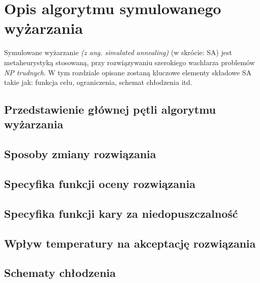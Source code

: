 \chapter{Opis algorytmu symulowanego wyżarzania} \label{chapter:sa-desc}
\label{annealing}
Symulowane wyżarzanie \cite{metaheuristic-handbook} \emph{(z ang. simulated annealing)} (w skrócie: SA) jest metaheurystyką stosowaną, przy rozwiązywaniu szerokiego wachlarza problemów \emph{NP trudnych}. W tym rozdziale opisane zostaną kluczowe elementy składowe SA takie jak: funkcja celu, ograniczenia, schemat chłodzenia itd.

\section{Przedstawienie głównej pętli algorytmu wyżarzania}
\section{Sposoby zmiany rozwiązania}
\section{Specyfika funkcji oceny rozwiązania}
\section{Specyfika funkcji kary za niedopuszczalność}
\section{Wpływ temperatury na akceptację rozwiązania}
\section{Schematy chłodzenia}
